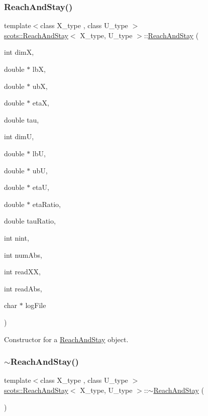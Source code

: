 \subsubsection{\texorpdfstring{Reach\+And\+Stay()}{ReachAndStay()}}
{\footnotesize\ttfamily template$<$class X\+\_\+type , class U\+\_\+type $>$ \\
\hyperlink{classscots_1_1ReachAndStay}{scots\+::\+Reach\+And\+Stay}$<$ X\+\_\+type, U\+\_\+type $>$\+::\hyperlink{classscots_1_1ReachAndStay}{Reach\+And\+Stay} (\begin{DoxyParamCaption}\item[{int}]{dimX,  }\item[{double $\ast$}]{lbX,  }\item[{double $\ast$}]{ubX,  }\item[{double $\ast$}]{etaX,  }\item[{double}]{tau,  }\item[{int}]{dimU,  }\item[{double $\ast$}]{lbU,  }\item[{double $\ast$}]{ubU,  }\item[{double $\ast$}]{etaU,  }\item[{double $\ast$}]{eta\+Ratio,  }\item[{double}]{tau\+Ratio,  }\item[{int}]{nint,  }\item[{int}]{num\+Abs,  }\item[{int}]{read\+XX,  }\item[{int}]{read\+Abs,  }\item[{char $\ast$}]{log\+File }\end{DoxyParamCaption})\hspace{0.3cm}{\ttfamily [inline]}}

Constructor for a \hyperlink{classscots_1_1ReachAndStay}{Reach\+And\+Stay} object. \mbox{\label{classscots_1_1ReachAndStay_a03d6d40d05fc810d88965b3f7a78c2fe}} 
\subsubsection{\texorpdfstring{$\sim$\+Reach\+And\+Stay()}{~ReachAndStay()}}
{\footnotesize\ttfamily template$<$class X\+\_\+type , class U\+\_\+type $>$ \\
\hyperlink{classscots_1_1ReachAndStay}{scots\+::\+Reach\+And\+Stay}$<$ X\+\_\+type, U\+\_\+type $>$\+::$\sim$\hyperlink{classscots_1_1ReachAndStay}{Reach\+And\+Stay} (\begin{DoxyParamCaption}{ }\end{DoxyParamCaption})\hspace{0.3cm}{\ttfamily [inline]}}

